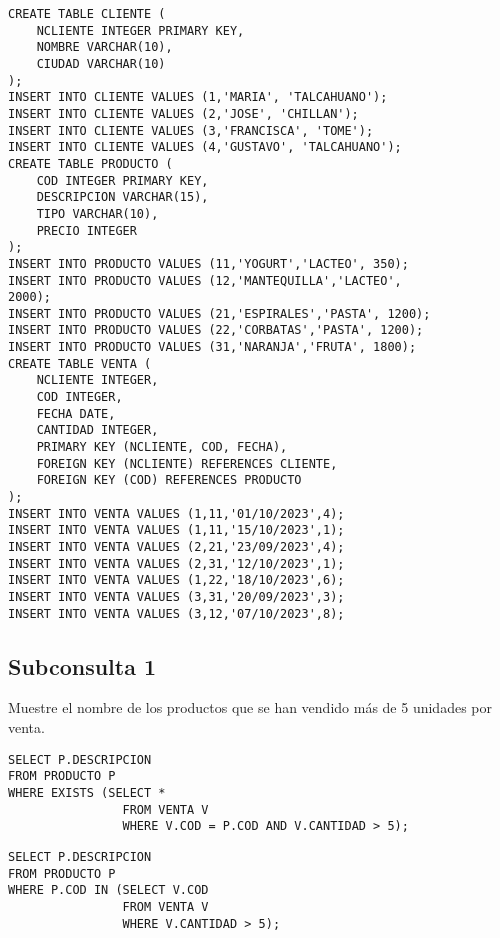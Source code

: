\documentclass{templateNote}
\begin{document}
\begin{tcolorbox}
    [colback=gray!5!white,colframe=gray!75!black,fonttitle=\bfseries,title=SQL]
    \begin{sqlcode}
    \end{sqlcode}
    \begin{verbatim}
CREATE TABLE CLIENTE (
    NCLIENTE INTEGER PRIMARY KEY,
    NOMBRE VARCHAR(10),
    CIUDAD VARCHAR(10)
);
INSERT INTO CLIENTE VALUES (1,'MARIA', 'TALCAHUANO');
INSERT INTO CLIENTE VALUES (2,'JOSE', 'CHILLAN');
INSERT INTO CLIENTE VALUES (3,'FRANCISCA', 'TOME');
INSERT INTO CLIENTE VALUES (4,'GUSTAVO', 'TALCAHUANO');
CREATE TABLE PRODUCTO (
    COD INTEGER PRIMARY KEY,
    DESCRIPCION VARCHAR(15),
    TIPO VARCHAR(10),
    PRECIO INTEGER
);
INSERT INTO PRODUCTO VALUES (11,'YOGURT','LACTEO', 350);
INSERT INTO PRODUCTO VALUES (12,'MANTEQUILLA','LACTEO',
2000);
INSERT INTO PRODUCTO VALUES (21,'ESPIRALES','PASTA', 1200);
INSERT INTO PRODUCTO VALUES (22,'CORBATAS','PASTA', 1200);
INSERT INTO PRODUCTO VALUES (31,'NARANJA','FRUTA', 1800);
CREATE TABLE VENTA (
    NCLIENTE INTEGER,
    COD INTEGER,
    FECHA DATE,
    CANTIDAD INTEGER,
    PRIMARY KEY (NCLIENTE, COD, FECHA),
    FOREIGN KEY (NCLIENTE) REFERENCES CLIENTE,
    FOREIGN KEY (COD) REFERENCES PRODUCTO
);
INSERT INTO VENTA VALUES (1,11,'01/10/2023',4);
INSERT INTO VENTA VALUES (1,11,'15/10/2023',1);
INSERT INTO VENTA VALUES (2,21,'23/09/2023',4);
INSERT INTO VENTA VALUES (2,31,'12/10/2023',1);
INSERT INTO VENTA VALUES (1,22,'18/10/2023',6);
INSERT INTO VENTA VALUES (3,31,'20/09/2023',3);
INSERT INTO VENTA VALUES (3,12,'07/10/2023',8);
    \end{verbatim}
\end{tcolorbox}

\newpage
\subsection{Subconsulta 1}
Muestre el nombre de los productos que se han vendido más de 5 unidades por venta.
\begin{tcolorbox}
    [colback=gray!5!white,colframe=gray!75!black,fonttitle=\bfseries,title=SQL]
    \begin{sqlcode}
    \end{sqlcode}
    \begin{verbatim}
SELECT P.DESCRIPCION
FROM PRODUCTO P
WHERE EXISTS (SELECT *
                FROM VENTA V
                WHERE V.COD = P.COD AND V.CANTIDAD > 5);
    \end{verbatim}
\end{tcolorbox}
\begin{tcolorbox}
    [colback=gray!5!white,colframe=gray!75!black,fonttitle=\bfseries,title=SQL]
    \begin{sqlcode}
    \end{sqlcode}
    \begin{verbatim}
SELECT P.DESCRIPCION
FROM PRODUCTO P
WHERE P.COD IN (SELECT V.COD
                FROM VENTA V
                WHERE V.CANTIDAD > 5);
    \end{verbatim}
\end{tcolorbox}
\end{document}
